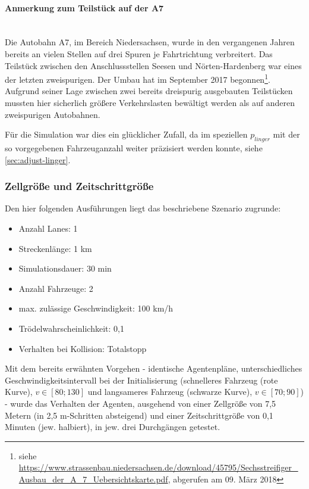 \paragraph*{Anmerkung zum Teilstück auf der A7}
\hfill \\
Die Autobahn A7, im Bereich Niedersachsen, wurde in den vergangenen Jahren bereits an vielen Stellen auf drei Spuren je Fahrtrichtung verbreitert.
Das Teilstück zwischen den Anschlussstellen Seesen und Nörten-Hardenberg war eines der letzten zweispurigen.
Der Umbau hat im September 2017 begonnen\footnote{siehe \url{https://www.strassenbau.niedersachsen.de/download/45795/Sechsstreifiger_Ausbau_der_A_7_Uebersichtskarte.pdf}, abgerufen am 09. März 2018}.
Aufgrund seiner Lage zwischen zwei bereits dreispurig ausgebauten Teilstücken mussten hier sicherlich größere Verkehrslasten bewältigt werden als auf anderen zweispurigen Autobahnen.

Für die Simulation war dies ein glücklicher Zufall, da im speziellen $p_{linger}$ mit der so vorgegebenen Fahrzeuganzahl weiter präzisiert werden konnte, siehe \cref{sec:adjust-linger}.




\subsubsection{Zellgröße und Zeitschrittgröße}
\label{sec:cellsize-timesteplength}

Den hier folgenden Ausführungen liegt das beschriebene Szenario zugrunde:
\begin{itemize}
\itemsep0em
	\item Anzahl Lanes: 1
	\item Streckenlänge: 1 km
	\item Simulationsdauer: 30 min
	\item Anzahl Fahrzeuge: 2
	\item max. zulässige Geschwindigkeit: 100 km/h
	\item Trödelwahrscheinlichkeit: 0,1
	\item Verhalten bei Kollision: Totalstopp
\end{itemize}
Mit dem bereits erwähnten Vorgehen - identische Agentenpläne, unterschiedliches Geschwindigkeitsintervall bei der Initialisierung (schnelleres Fahrzeug (rote Kurve), $ v \in [80; 130] $ und langsameres Fahrzeug (schwarze Kurve), $ v \in [70; 90] $) - wurde das Verhalten der Agenten, ausgehend von einer Zellgröße von 7,5 Metern (in 2,5 m-Schritten absteigend) und einer Zeitschrittgröße von 0,1 Minuten (jew. halbiert), in jew. drei Durchgängen getestet.

